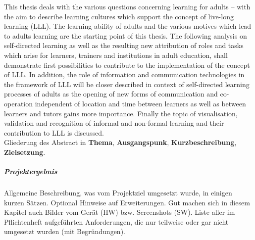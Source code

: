 This thesis deals with the various questions concerning learning for adults – with the aim to describe learning cultures which support the concept of live-long learning (LLL). The learning ability of adults and the various motives which lead to adults learning are the starting point of this thesis. The following analysis on self-directed learning as well as the resulting new attribution of roles and tasks which arise for learners, trainers and institutions in adult education, shall demonstrate first possibilities to contribute to the implementation of the concept of LLL. In addition, the role of information and communication technologies in the framework of LLL will be closer described in context of self-directed learning processes of adults as the opening of new forms of communication and co-operation independent of location and time between learners as well as between learners and tutors gains more importance. Finally the topic of visualisation, validation and recognition of informal and non-formal learning and their contribution to LLL is discussed. \\

Gliederung des Abstract in \textbf{Thema}, \textbf{Ausgangspunk}, \textbf{Kurzbeschreibung}, \textbf{Zielsetzung}.  

\subparagraph{Projektergebnis}

Allgemeine Beschreibung, was vom Projektziel umgesetzt wurde, in einigen kurzen Sätzen. Optional Hinweise auf Erweiterungen. Gut machen sich in diesem Kapitel auch Bilder vom Gerät (HW) bzw. Screenshots (SW).
Liste aller im Pflichtenheft aufgeführten Anforderungen, die nur teilweise oder gar nicht umgesetzt wurden (mit Begründungen).